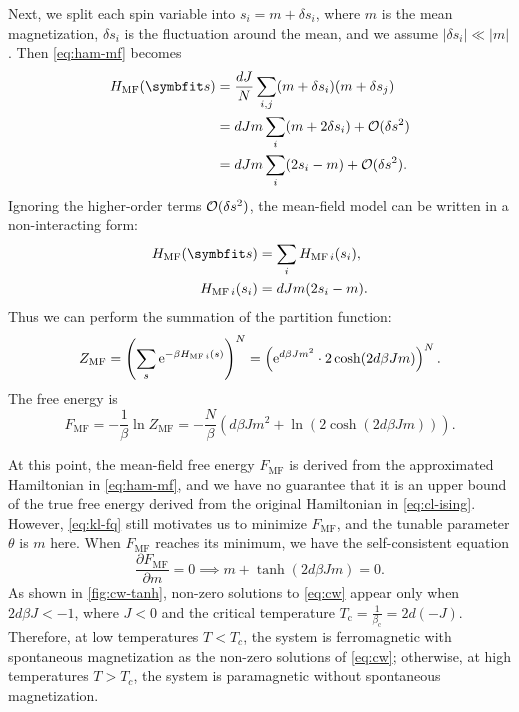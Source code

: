 Next, we split each spin variable into $s_i = m + \delta s_i$, where $m$ is the mean magnetization, $\delta s_i$ is the fluctuation around the mean, and we assume $|\delta s_i| \ll |m|$. Then \cref{eq:ham-mf} becomes
\begin{align}
H_\text{MF}(\vs) &= \frac{d J}{N} \sum_{i, j} (m + \delta s_i) (m + \delta s_j) \\
&= d J m \sum_i (m + 2 \delta s_i) + \calO(\delta s^2) \\
&= d J m \sum_i (2 s_i - m) + \calO(\delta s^2).
\end{align}
Ignoring the higher-order terms $\mathcal{O}(\delta s^2)$, the mean-field model can be written in a non-interacting form:
\begin{align}
H_\text{MF}(\vs) &= \sum_i H_{\text{MF}\,i}(s_i), \\
H_{\text{MF}\,i}(s_i) &= d J m (2 s_i - m).
\label{eq:ham-mf-noninter}
\end{align}
Thus we can perform the summation of the partition function:
\begin{equation}
Z_\text{MF}
= \left( \sum_s \mathrm{e}^{-\beta H_{\text{MF}\,i}(s)} \right)^N
= \left( \mathrm{e}^{d \beta J m^2} \cdot 2 \cosh (2 d \beta J m) \right)^N.
\end{equation}
The free energy is
\begin{equation}
F_\text{MF} = -\frac{1}{\beta} \ln Z_\text{MF} = - \frac{N}{\beta} \left(d \beta J m^2 + \ln \left( 2 \cosh (2 d \beta J m) \right) \right).
\label{eq:fe-mf}
\end{equation}

At this point, the mean-field free energy $F_\text{MF}$ is derived from the approximated Hamiltonian in \cref{eq:ham-mf}, and we have no guarantee that it is an upper bound of the true free energy derived from the original Hamiltonian in \cref{eq:cl-ising}. However, \cref{eq:kl-fq} still motivates us to minimize $F_\text{MF}$, and the tunable parameter $\theta$ is $m$ here. When $F_\text{MF}$ reaches its minimum, we have the self-consistent equation
\begin{equation}
\frac{\partial F_\text{MF}}{\partial m} = 0 \implies
m + \tanh(2 d \beta J m) = 0.
\label{eq:cw}
\end{equation}
As shown in \cref{fig:cw-tanh}, non-zero solutions to \cref{eq:cw} appear only when $2 d \beta J < -1$, where $J < 0$ and the critical temperature $T_\text{c} = \frac{1}{\beta_\text{c}} = 2 d (-J)$. Therefore, at low temperatures $T < T_c$, the system is ferromagnetic with spontaneous magnetization as the non-zero solutions of \cref{eq:cw}; otherwise, at high temperatures $T > T_c$, the system is paramagnetic without spontaneous magnetization.

